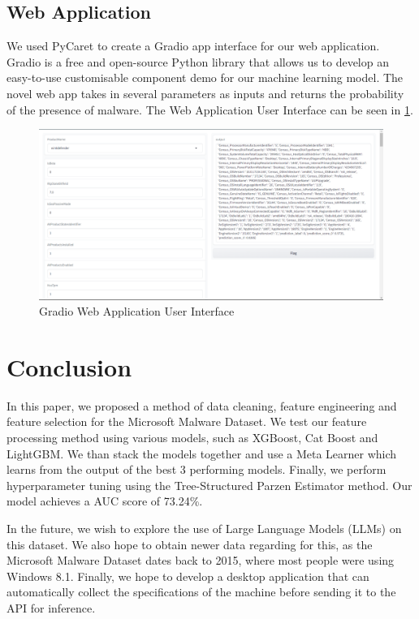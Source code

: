 \documentclass[runningheads]{llncs}
\begin{document}
\subsection{Web Application}
We used PyCaret to create a Gradio \cite{gradio} app interface for our web application. Gradio is a free and open-source Python library that allows us to develop an easy-to-use customisable component demo for our machine learning model. The novel web app takes in several parameters as inputs and returns the probability of the presence of malware. The Web Application User Interface can be seen in \ref{fig:enter-label}.
\begin{figure}
    \centering
    \includegraphics[width=\linewidth]{images/Gradio App Screenshot.png}
    \caption{Gradio Web Application User Interface}
    \label{fig:enter-label}
\end{figure}

\section{Conclusion}
In this paper, we proposed a method of data cleaning, feature engineering and feature selection for the Microsoft Malware Dataset. We test our feature processing method using various models, such as XGBoost, Cat Boost and LightGBM. We than stack the models together and use a Meta Learner which learns from the output of the best 3 performing models. Finally, we perform hyperparameter tuning using the Tree-Structured Parzen Estimator method. Our model achieves a AUC score of 73.24\%. 

In the future, we wish to explore the use of Large Language Models (LLMs) on this dataset. We also hope to obtain newer data regarding for this, as the Microsoft Malware Dataset dates back to 2015, where most people were using Windows 8.1. Finally, we hope to develop a desktop application that can automatically collect the specifications of the machine before sending it to the API for inference. 









\end{document}

